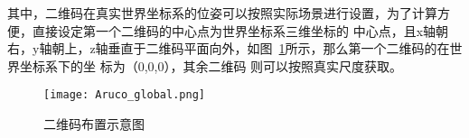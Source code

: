 其中，二维码在真实世界坐标系的位姿可以按照实际场景进行设置，为了计算方便，直接设定第一个二维码的中心点为世界坐标系三维坐标的
中心点，且x轴朝右，y轴朝上，z轴垂直于二维码平面向外，如图~\ref{fig:Aruco_global}所示，那么第一个二维码的在世界坐标系下的坐
标为（0,0,0），其余二维码
则可以按照真实尺度获取。
\begin{figure}[H] %
  \centering
  \texttt{[image: Aruco\_global.png]}
  \caption{二维码布置示意图}
  \label{fig:Aruco_global}
\end{figure}
